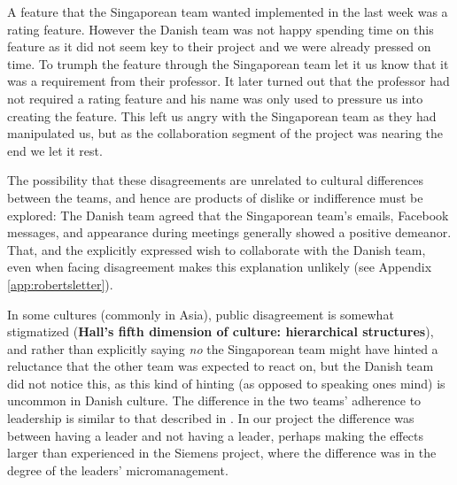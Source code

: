 A feature that the Singaporean team wanted implemented in the last week was
a rating feature. However the Danish team was not happy spending time on this
feature as it did not seem key to their project and we were already pressed on 
time. To trumph the feature through the Singaporean team let it us know
that it was a requirement from their professor. It later turned out that the
professor had not required a rating feature and his name was only used
to pressure us into creating the feature. This left us angry with the 
Singaporean team as they had manipulated us, but as the collaboration
segment of the project was nearing the end we let it rest.

The possibility that these disagreements are unrelated to cultural differences
between the teams, and hence are products of dislike or indifference must be
explored: The Danish team agreed that the Singaporean team's emails, Facebook
messages, and appearance during meetings generally showed a positive demeanor.
That, and the explicitly expressed wish to collaborate with the Danish team,
even when facing disagreement makes this explanation unlikely (see Appendix
\ref{app:robertsletter}).

In some cultures (commonly in Asia), public disagreement is
somewhat stigmatized (\textbf{Hall's fifth dimension of culture: hierarchical
structures})\cite{surprises}\cite{herbsiemens}, and rather
than explicitly saying \emph{no} the Singaporean team might have hinted a
reluctance that the other team was expected to react on, but the Danish team
did not notice this, as this kind of hinting (as opposed to speaking ones mind)
is uncommon in Danish culture.
The difference in the two teams' adherence to leadership is similar to that
described in \cite{herbsiemens}. In our project the difference was
between having a leader and not having a leader, perhaps making the effects
larger than experienced in the Siemens project, where the difference was in the
degree of the leaders' micromanagement.

